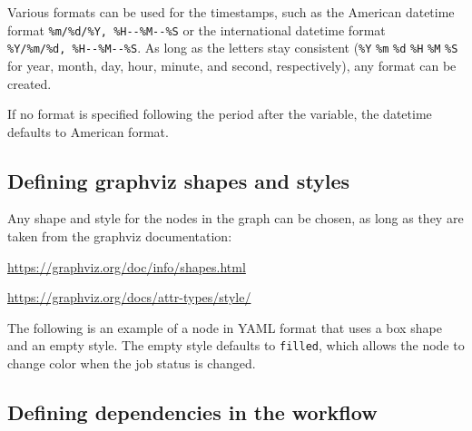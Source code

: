 Various formats can be used for the timestamps, such as the American
datetime format \texttt{\%m/\%d/\%Y,\ \%H-\/-\%M-\/-\%S} or the
international datetime format \texttt{\%Y/\%m/\%d,\ \%H-\/-\%M-\/-\%S}.
As long as the letters stay consistent (\texttt{\%Y} \texttt{\%m}
\texttt{\%d} \texttt{\%H} \texttt{\%M} \texttt{\%S} for year, month,
day, hour, minute, and second, respectively), any format can be created.

If no format is specified following the period after the variable, the
datetime defaults to American format.

\hypertarget{defining-graphviz-shapes-and-styles}{%
\subsection{Defining graphviz shapes and
styles}\label{defining-graphviz-shapes-and-styles}}

Any shape and style for the nodes in the graph can be chosen, as long as
they are taken from the graphviz documentation:

\url{https://graphviz.org/doc/info/shapes.html}

\url{https://graphviz.org/docs/attr-types/style/}

The following is an example of a node in YAML format that uses a box
shape and an empty style. The empty style defaults to \texttt{filled},
which allows the node to change color when the job status is changed.

\begin{Shaded}
\begin{Highlighting}[]
\end{Highlighting}
\end{Shaded}

\hypertarget{defining-dependencies-in-the-workflow}{%
\subsection{Defining dependencies in the
workflow}\label{defining-dependencies-in-the-workflow}}

